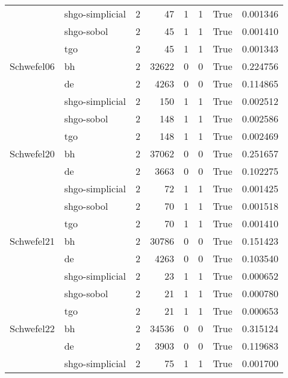 \begin{longtable}{llrrrrlr}
         & shgo-simplicial &     2 &       47 &      1 &       1 &    True &    0.001346 \\
         & shgo-sobol &     2 &       45 &      1 &       1 &    True &    0.001410 \\
         & tgo &     2 &       45 &      1 &       1 &    True &    0.001343 \\
Schwefel06 & bh &     2 &    32622 &      0 &       0 &    True &    0.224756 \\
         & de &     2 &     4263 &      0 &       0 &    True &    0.114865 \\
         & shgo-simplicial &     2 &      150 &      1 &       1 &    True &    0.002512 \\
         & shgo-sobol &     2 &      148 &      1 &       1 &    True &    0.002586 \\
         & tgo &     2 &      148 &      1 &       1 &    True &    0.002469 \\
Schwefel20 & bh &     2 &    37062 &      0 &       0 &    True &    0.251657 \\
         & de &     2 &     3663 &      0 &       0 &    True &    0.102275 \\
         & shgo-simplicial &     2 &       72 &      1 &       1 &    True &    0.001425 \\
         & shgo-sobol &     2 &       70 &      1 &       1 &    True &    0.001518 \\
         & tgo &     2 &       70 &      1 &       1 &    True &    0.001410 \\
Schwefel21 & bh &     2 &    30786 &      0 &       0 &    True &    0.151423 \\
         & de &     2 &     4263 &      0 &       0 &    True &    0.103540 \\
         & shgo-simplicial &     2 &       23 &      1 &       1 &    True &    0.000652 \\
         & shgo-sobol &     2 &       21 &      1 &       1 &    True &    0.000780 \\
         & tgo &     2 &       21 &      1 &       1 &    True &    0.000653 \\
Schwefel22 & bh &     2 &    34536 &      0 &       0 &    True &    0.315124 \\
         & de &     2 &     3903 &      0 &       0 &    True &    0.119683 \\
         & shgo-simplicial &     2 &       75 &      1 &       1 &    True &    0.001700 \\

\end{longtable}
